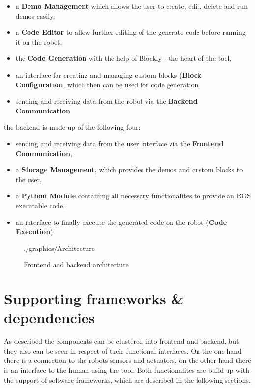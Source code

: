 \begin{itemize}
	\item a \textbf{Demo Management} which allows the user to create, edit, delete and run demos easily,
	\item a \textbf{Code Editor} to allow further editing of the generate code before running it on the robot,
	\item the \textbf{Code Generation} with the help of Blockly - the heart of the tool,
	\item an interface for creating and managing custom blocks (\textbf{Block Configuration}, which then can be used for code generation,
	\item sending and receiving data from the robot via the \textbf{Backend Communication}
\end{itemize}

the backend is made up of the following four:

\begin{itemize}
	\item sending and receiving data from the user interface via the \textbf{Frontend Communication},
	\item a \textbf{Storage Management}, which provides the demos and custom blocks to the user,
	\item a \textbf{Python Module} containing all necessary functionalites to provide an ROS executable code,
	\item an interface to finally execute the generated code on the robot (\textbf{Code Execution}).
\end{itemize}


\begin{figure}[htbp]
	\centering
	\begin{overpic}[width=\linewidth]{./graphics/Architecture}
	\end{overpic}
	\caption{Frontend and backend architecture}%
	\label{fig:Architecture}%
\end{figure}

\section{Supporting frameworks \& dependencies}
As described the components can be clustered into frontend and backend, but they also can be seen in respect of their functional interfaces. On the one hand there is a connection to the robots sensors and actuators, on the other hand there is an interface to the human using the tool. Both functionalites are build up with the support of software frameworks, which are described in the following sections.

